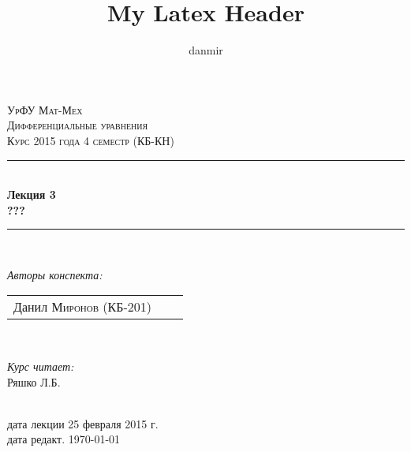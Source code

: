 \documentclass[12pt,a4paper,hidelinks]{article}            %
\begin{document}
\begin{titlepage}

\title{My Latex Header}
\author{danmir}

\vspace*{\fill}                                            %

\newcommand{\HRule}{\rule{\linewidth}{0.3mm}}              %

\center                                                    %

\textsc{\Large УрФУ Мат-Мех}\\[1.5cm]
\textsc{\Large Дифференциальные уравнения}\\[0.5cm]
\textsc{\large Курс 2015 года 4 семестр (КБ-КН)}\\[0.5cm]

\HRule \\[0.4cm]
{ \huge \bfseries Лекция 3 \\ ???}\\[0.4cm]
\HRule \\[1.5cm]

\begin{minipage}{0.4\textwidth}
\begin{flushleft} \large
\emph{Авторы конспекта:}\\
\begin{tabular}{ l c r }
  Данил \textsc{Миронов (КБ-201)}\\
\end{tabular}
\end{flushleft}
\end{minipage}
~
\begin{minipage}{0.4\textwidth}
\begin{flushright} \large
\emph{Курс читает:} \\
Ряшко Л.Б. \textsc{}                                             %
\end{flushright}
\end{minipage}\\[4cm]

{дата лекции \large 25 февраля 2015 г.}\\
{дата редакт. \large \today}\\[3cm]                                              %


\vspace*{\fill}                                                           %

\end{titlepage}
\end{document}
